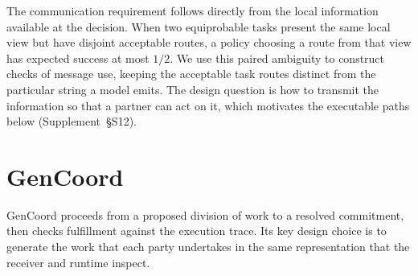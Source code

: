 \documentclass[sigconf,nonacm,balance=false]{aamas}
\begin{document}
The communication requirement follows directly from the local information available at the decision. When two equiprobable tasks present the same local view but have disjoint acceptable routes, a policy choosing a route from that view has expected success at most $1/2$. We use this paired ambiguity to construct checks of message use, keeping the acceptable task routes distinct from the particular string a model emits. The design question is how to transmit the information so that a partner can act on it, which motivates the executable paths below (Supplement~\S S12).

\section{GenCoord}
\label{sec:method}
GenCoord proceeds from a proposed division of work to a resolved commitment, then checks fulfillment against the execution trace. Its key design choice is to generate the work that each party undertakes in the same representation that the receiver and runtime inspect.
\end{document}

